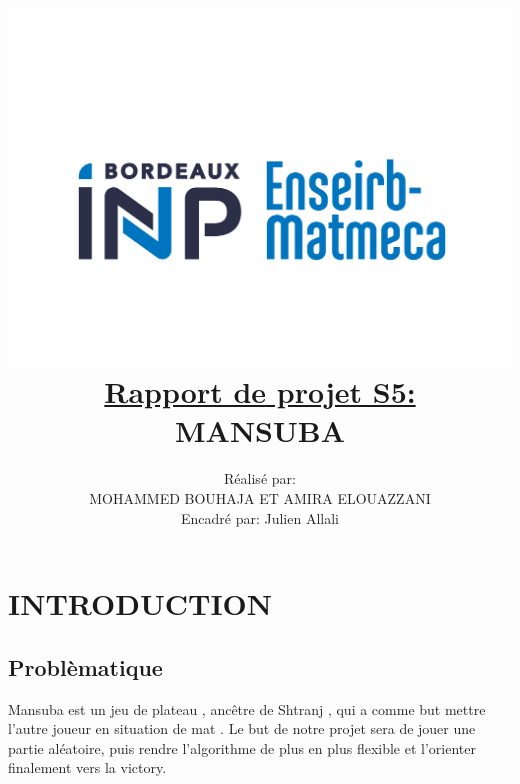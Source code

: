 \documentclass[a4paper]{article}
\begin{document}

\title{  \includegraphics[scale=0.09]{logo.png} \\ \underline{Rapport de projet S5:} \\ \textbf{MANSUBA} }


\author{Réalisé par:\\MOHAMMED BOUHAJA ET AMIRA ELOUAZZANI \\Encadré par: Julien Allali}
\maketitle





\newpage

\tableofcontents

\newpage



\section{INTRODUCTION}
\subsection{Problèmatique}
Mansuba est un jeu de plateau , ancêtre de Shtranj , qui a comme but mettre l’autre joueur en situation de mat . 
Le but de notre projet sera de jouer une partie aléatoire, puis rendre l'algorithme de plus en plus flexible
et l'orienter finalement vers la victory. 
\end{document}
